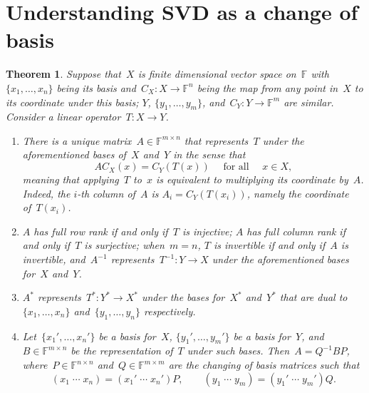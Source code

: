 \documentclass[11pt,a4paper]{article}  %
\numberwithin{equation}{section}
\newtheorem{theorem}{Theorem}%
\theoremstyle{definition}
\def\FF{\mathbb{F}}
\newcommand{\sss}[1]{{\scriptscriptstyle{#1}}}
\newcommand{\inv}{{-1}}
\newcommand{\adj}{*}
\newcommand{\range}{\mathrm{range}}
\begin{document}
\section{Understanding SVD as a change of basis}

\begin{theorem}
  \label{th:matrix}
  Suppose that~$X$ is finite dimensional vector space on~$\FF$ with $\{x_1,  \dots,
  x_n\}$ being its basis and~$C_\sss{X} : X \to \FF^{n}$ being the map from any point in~$X$ to its
  coordinate under this basis; $Y$, $\{y_1, \dots, y_m\}$, and~$C_\sss{Y} : Y \to \FF^{m}$ are similar.
  Consider a linear operator~$T \mathrel{:} X \to Y$.
  \begin{enumerate}[leftmargin=1.5em]
    \item There is a unique matrix~$A\in \FF^{m\times n}$
   that represents~$T$ under the aforementioned bases of~$X$ and~$Y$ in the sense that
  \begin{equation*}
    A C_\sss{X} (x) = C_\sss{Y} (T (x)) \quad \text{ for all } \quad x\in X,
  \end{equation*}
  meaning that applying~$T$ to~$x$ is equivalent to multiplying its coordinate by~$A$.
  Indeed, the $i$-th column of~$A$ is $A_i = C_\sss{Y}(T(x_i))$, namely the coordinate of~$T(x_i)$.
\item $A$ has full row rank if and only if~$T$ is injective; $A$ has full column rank if and only
  if~$T$ is surjective;
  when~$m=n$, $T$ is invertible if and only if~$A$ is invertible, and~$A^\inv$
  represents~$T^\inv\mathrel{:} Y\to X$ under the aforementioned bases for~$X$ and~$Y$.
\item $A^\adj$ represents~$T^\adj \mathrel{:} Y^\adj \to X^\adj$ under the bases for~$X^*$ and~$Y^*$
  that are dual to~$\{x_1, \dots, x_n\}$ and~$\{y_1, \dots, y_n\}$ respectively.
\item Let~$\{x_1', \dots, x_n'\}$ be a basis for~$X$, $\{y_1', \dots, y_m'\}$ be a
  basis for~$Y$, and~$B\in \FF^{m\times n}$ be the representation of~$T$ under such bases.
  Then~$A = Q^\inv B P$, where~$P\in \FF^{n\times n}$ and~$Q\in \FF^{m \times m}$
  are the changing of basis matrices such that
  \begin{equation*}
    (x_1\; \cdots\; x_n) = (x_1'\; \cdots\; x_n')P, \qquad
    (y_1\; \cdots\; y_m) = (y_1'\; \cdots\; y_m')Q.
  \end{equation*}
  \end{enumerate}
\end{theorem}
\end{document}
